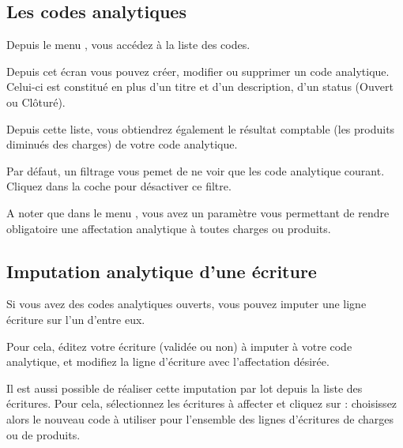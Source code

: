 \documentclass[a4paper,10pt,oneside,french]{sphinxmanual}
\begin{document}
\subsection{Les codes analytiques}
\label{\detokenize{accounting/costaccounting:les-codes-analytiques}}
Depuis le menu , vous accédez à la liste des codes.

Depuis cet écran vous pouvez créer, modifier ou supprimer un code analytique. Celui-ci est constitué
en plus d’un titre et d’un description, d’un status (Ouvert ou Clôturé).

Depuis cette liste, vous obtiendrez également le résultat comptable (les produits diminués des charges) de votre code analytique.
\begin{quote}

\noindent{}
\end{quote}

Par défaut, un filtrage vous pemet de ne voir que les code analytique courant. Cliquez dans la coche pour désactiver ce filtre.

A noter que dans le menu , vous avez un paramètre vous permettant
de rendre obligatoire une affectation analytique à toutes charges ou produits.


\subsection{Imputation analytique d’une écriture}
\label{\detokenize{accounting/costaccounting:imputation-analytique-d-une-ecriture}}
Si vous avez des codes analytiques ouverts, vous pouvez imputer une ligne écriture sur l’un d’entre eux.
\begin{quote}

\noindent{}
\end{quote}

Pour cela, éditez votre écriture (validée ou non) à imputer à votre code analytique, et modifiez la ligne d’écriture avec l’affectation désirée.

Il est aussi possible de réaliser cette imputation par lot depuis la liste des écritures.
Pour cela, sélectionnez les écritures à affecter et cliquez sur : choisissez alors le nouveau code à utiliser
pour l’ensemble des lignes d’écritures de charges ou de produits.
\end{document}
